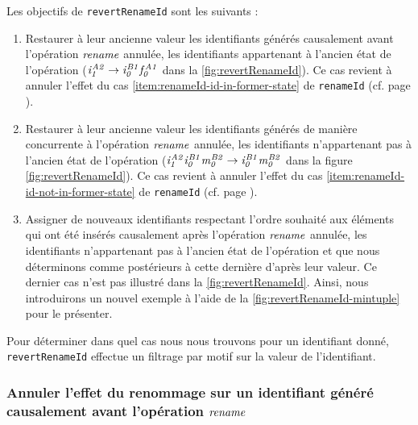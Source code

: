 Les objectifs de \texttt{revertRenameId} sont les suivants :
\begin{enumerate}
  \item \label{item:revert-rename-1}
    Restaurer à leur ancienne valeur les identifiants générés causalement avant l'opération $\mathit{rename}$ annulée, \ie les identifiants appartenant à l'ancien état de l'opération (\eg $\mathit{i}^{\mathit{A2}}_{\mathit{1}} \rightarrow \mathit{i}^{\mathit{B1}}_{\mathit{0}}\mathit{f}^{\mathit{A1}}_{\mathit{0}}$ dans la \autoref{fig:revertRenameId}).
    Ce cas revient à annuler l'effet du cas \ref{item:renameId-id-in-former-state} de \texttt{renameId} (cf. page \pageref{item:renameId-id-in-former-state}).
  \item \label{item:revert-rename-2}
    Restaurer à leur ancienne valeur les identifiants générés de manière concurrente à l'opération $\mathit{rename}$ annulée, \ie les identifiants n'appartenant pas à l'ancien état de l'opération (\eg $\mathit{i}^{\mathit{A2}}_{\mathit{1}}\mathit{i}^{\mathit{B1}}_{\mathit{0}}\mathit{m}^{\mathit{B2}}_{\mathit{0}} \rightarrow \mathit{i}^{\mathit{B1}}_{\mathit{0}}\mathit{m}^{\mathit{B2}}_{\mathit{0}}$ dans la figure \autoref{fig:revertRenameId}).
    Ce cas revient à annuler l'effet du cas \ref{item:renameId-id-not-in-former-state} de \texttt{renameId} (cf. page \pageref{item:renameId-id-in-former-state}).
  \item \label{item:revert-rename-3}
    Assigner de nouveaux identifiants respectant l'ordre souhaité aux éléments qui ont été insérés causalement après l'opération $\mathit{rename}$ annulée, \ie les identifiants n'appartenant pas à l'ancien état de l'opération et que nous déterminons comme postérieurs à cette dernière d'après leur valeur.
    Ce dernier cas n'est pas illustré dans la \autoref{fig:revertRenameId}.
    Ainsi, nous introduirons un nouvel exemple à l'aide de la \autoref{fig:revertRenameId-mintuple} pour le présenter.
\end{enumerate}

Pour déterminer dans quel cas nous nous trouvons pour un identifiant donné, \texttt{revertRenameId} effectue un filtrage par motif sur la valeur de l'identifiant.

\subsubsection{Annuler l'effet du renommage sur un identifiant généré causalement avant l'opération $\mathit{rename}$}

